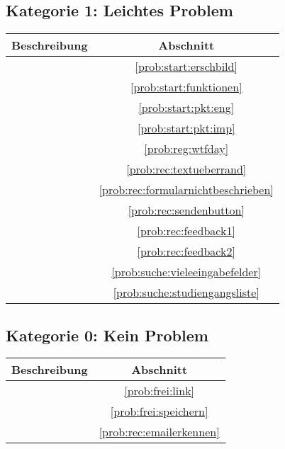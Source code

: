 \subsection*{Kategorie 1: Leichtes Problem}
\begin{tabular}{|p{12cm}|c|}
\hline
\textbf{Beschreibung} & \textbf{Abschnitt} \\
\hline\hline
\nameref{prob:start:erschbild} & \ref{prob:start:erschbild}\\
\nameref{prob:start:funktionen} & \ref{prob:start:funktionen}\\
\nameref{prob:start:pkt:eng} & \ref{prob:start:pkt:eng}\\
\nameref{prob:start:pkt:imp} & \ref{prob:start:pkt:imp}\\
\nameref{prob:reg:wtfday} & \ref{prob:reg:wtfday}\\
\nameref{prob:rec:textueberrand} & \ref{prob:rec:textueberrand}\\
\nameref{prob:rec:formularnichtbeschrieben} & \ref{prob:rec:formularnichtbeschrieben}\\
\nameref{prob:rec:sendenbutton} & \ref{prob:rec:sendenbutton}\\
\nameref{prob:rec:feedback1} & \ref{prob:rec:feedback1}\\
\nameref{prob:rec:feedback2} & \ref{prob:rec:feedback2}\\
\nameref{prob:suche:vieleeingabefelder} & \ref{prob:suche:vieleeingabefelder}\\
\nameref{prob:suche:studiengangsliste} & \ref{prob:suche:studiengangsliste}\\
\hline
\end{tabular}

\subsection*{Kategorie 0: Kein Problem}
\begin{tabular}{|p{12cm}|c|}
\hline
\textbf{Beschreibung} & \textbf{Abschnitt} \\
\hline\hline
\nameref{prob:frei:link} & \ref{prob:frei:link}\\
\nameref{prob:frei:speichern} & \ref{prob:frei:speichern}\\
\nameref{prob:rec:emailerkennen} & \ref{prob:rec:emailerkennen}\\
\hline
\end{tabular}

